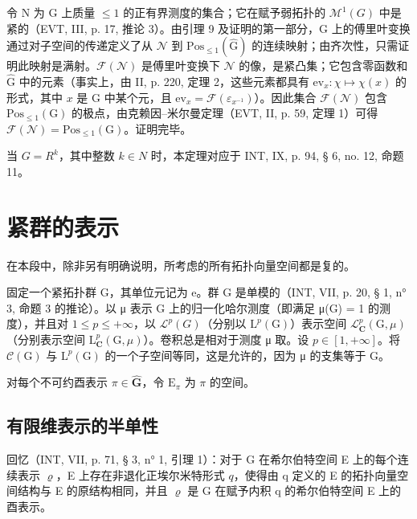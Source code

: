 令 N 为 G 上质量 \(\leqslant 1\) 的正有界测度的集合；它在赋予弱拓扑的 \(\mathcal{M}^{1}(G)\) 中是紧的（EVT, III, p. 17, 推论 3）。由引理 9 及证明的第一部分，G 上的傅里叶变换通过对子空间的传递定义了从 \(\mathcal{N}\) 到 \(\mathrm{Pos}_{\leqslant 1}(\widehat{\mathrm{G}})\) 的连续映射；由齐次性，只需证明此映射是满射。\(\mathcal{F}(\mathcal{N})\) 是傅里叶变换下 \(\mathcal{N}\) 的像，是紧凸集；它包含零函数和 \(\widehat{\mathrm{G}}\) 中的元素（事实上，由 II, p. 220, 定理 2，这些元素都具有 \(\mathrm{ev}_x\colon \chi \mapsto \chi (x)\) 的形式，其中 \(x\) 是 G 中某个元，且 \(\mathrm{ev}_x = \mathcal{F}(\varepsilon_{x^{-1}})\)）。因此集合 \(\mathcal{F}(\mathcal{N})\) 包含 \(\mathrm{Pos}_{\leqslant 1}(\mathrm{G})\) 的极点，由克赖因–米尔曼定理（EVT, II, p. 59, 定理 1）可得 \(\mathcal{F}(\mathcal{N}) = \mathrm{Pos}_{\leqslant 1}(\mathrm{G})\)。证明完毕。

当 \(G = R^{k}\)，其中整数 \(k \in N\) 时，本定理对应于 INT, IX, p. 94, § 6, no. 12, 命题 11。

\section{紧群的表示}

在本段中，除非另有明确说明，所考虑的所有拓扑向量空间都是复的。

固定一个紧拓扑群 G，其单位元记为 e。群 G 是单模的（INT, VII, p. 20, § 1, n° 3, 命题 3 的推论）。以 μ 表示 G 上的归一化哈尔测度（即满足 μ(G) = 1 的测度），并且对 \(1 \leqslant p \leqslant +\infty\)，以 \(\mathcal{L}^{p}(G)\)（分别以 \(\mathrm{L}^{p}(\mathrm{G})\)）表示空间 \(\mathcal{L}_{\mathbf{C}}^{p}(\mathrm{G}, \mu)\)（分别表示空间 \(\mathrm{L}_{\mathbf{C}}^{p}(\mathrm{G}, \mu)\)）。卷积总是相对于测度 μ 取。设 \(p \in [1, +\infty]\)。将 \(\mathcal{C}(\mathrm{G})\) 与 \(\mathrm{L}^{p}(\mathrm{G})\) 的一个子空间等同，这是允许的，因为 μ 的支集等于 G。

对每个不可约酉表示 \(\pi \in \widehat{\mathbf{G}}\)，令 \(\mathrm{E}_{\pi}\) 为 \(\pi\) 的空间。

\subsection{有限维表示的半单性}

回忆（INT, VII, p. 71, § 3, n° 1, 引理 1）：对于 G 在希尔伯特空间 E 上的每个连续表示 \(\varrho\)，E 上存在非退化正埃尔米特形式 \(q\)，使得由 q 定义的 E 的拓扑向量空间结构与 E 的原结构相同，并且 \(\varrho\) 是 G 在赋予内积 q 的希尔伯特空间 E 上的酉表示。

